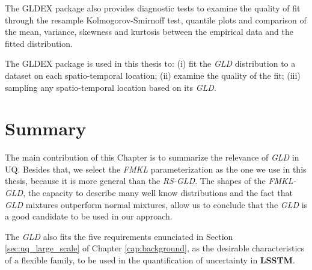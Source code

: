 The GLDEX package also provides diagnostic tests to examine the quality of fit through the resample Kolmogorov-Smirnoff test, quantile plots and comparison of the mean, variance, skewness and kurtosis between the empirical data and the fitted distribution.

The GLDEX package is used in this thesis to: (i) fit the \textit{GLD} distribution to a dataset on each spatio-temporal location; (ii) examine the quality of the fit; (iii) sampling any spatio-temporal location based on its \textit{GLD}.

\section{Summary}\label{sec:gld_summary}
The main contribution of this Chapter is to summarize the relevance of \textit{GLD} in UQ. Besides that, we select the \textit{FMKL} parameterization as the one we use in this thesis, because it is more general than the \textit{RS-GLD}. The shapes of the \textit{FMKL-GLD}, the capacity to describe many well know distributions and the fact that \textit{GLD} mixtures outperform normal mixtures, allow us to conclude that the \textit{GLD} is a good candidate to be used in our approach. 

The \textit{GLD} also fits the five requirements enunciated in Section \ref{sec:uq_large_scale} of Chapter \ref{cap:background}, as the desirable characteristics of a flexible family, to be used in the quantification of uncertainty in \textbf{LSSTM}.

